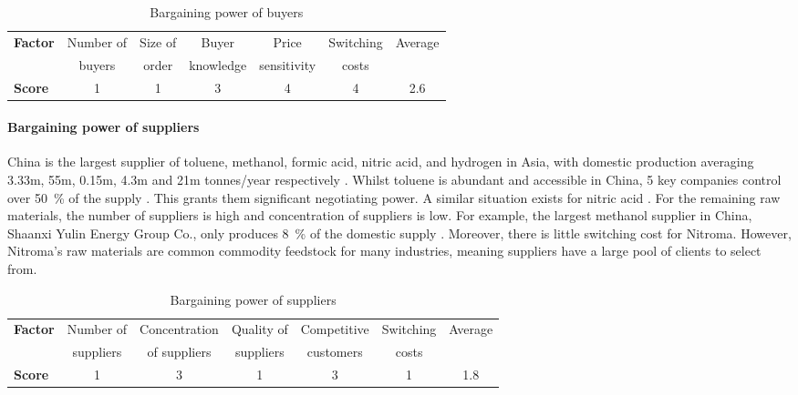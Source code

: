 \begin{table}[H]
\centering
\caption{Bargaining power of buyers}
\label{tab:substitute-products}
\begin{tabular}{lcccccc}
\toprule
\multirow{2}{*}{\textbf{Factor}} & Number of    & Size of   & Buyer          & Price          & Switching & Average  \\
                                 & buyers       & order     & knowledge      & sensitivity    & costs     &          \\\midrule
\textbf{Score}                   & 1            & 1         & 3              & 4              & 4         & \cellcolor{green}2.6       \\\bottomrule
\end{tabular}%
\end{table}

\paragraph{Bargaining power of suppliers}
China is the largest supplier of toluene, methanol, formic acid, nitric acid, and hydrogen in Asia, with domestic production averaging 3.33m, 55m, 0.15m, 4.3m and 21m tonnes/year respectively \cite{ccm_data_market_2015,yap_chemical_2018,guo_chemical_2016,icis_explore_chemical_nodate,jianjun_prospects_2020}. Whilst toluene is abundant and accessible in China, 5 key companies control over \SI{50}{\percent} of the supply \cite{yap_chemical_2018}. This grants them significant negotiating power. A similar situation exists for nitric acid \cite{guo_chemical_2016}. For the remaining raw materials, the number of suppliers is high and concentration of suppliers is low. For example, the largest methanol supplier in China, Shaanxi Yulin Energy Group Co., only produces \SI{8}{\percent} of the domestic supply \cite{icis_explore_chemical_nodate}. Moreover, there is little switching cost for Nitroma. However, Nitroma’s raw materials are common commodity feedstock for many industries, meaning suppliers have a large pool of clients to select from.

\begin{table}[H]
\centering
\caption{Bargaining power of suppliers}
\label{tab:supplier-power}
\begin{tabular}{lcccccc}
\toprule
\multirow{2}{*}{\textbf{Factor}} & Number of        & Concentration    & Quality of       & Competitive      & Switching     & Average   \\
                                 & suppliers        & of suppliers     & suppliers        & customers        & costs                     \\\midrule
\textbf{Score}                   & 1                & 3                & 1                & 3                & 1             & \cellcolor{green}1.8       \\\bottomrule
\end{tabular}%
\end{table}


